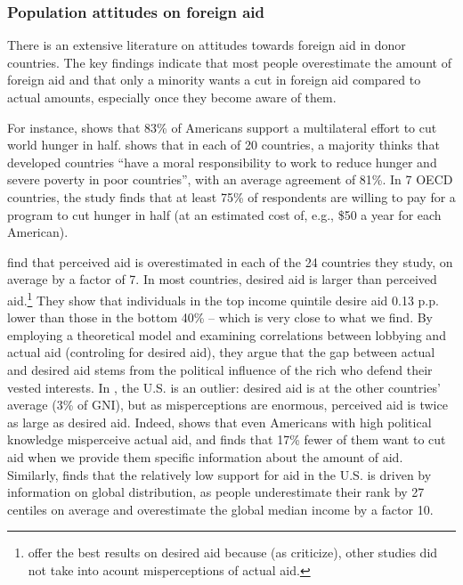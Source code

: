 \subsubsection{Population attitudes on foreign aid}\label{subsubsec:literature_foreign_aid}

There is an extensive literature on attitudes towards foreign aid in donor countries. The key findings indicate that most people overestimate the amount of foreign aid and that only a minority wants a cut in foreign aid compared to actual amounts, especially once they become aware of them. 

For instance,  shows that 83\% of Americans support a multilateral effort to cut world hunger in half. 
 shows that in each of 20 countries, a majority thinks that developed countries ``have a moral responsibility to work to reduce hunger and severe poverty in poor countries'', with an average agreement of 81\%. In 7 OECD countries, the study finds that at least 75\% of respondents are willing to pay for a program to cut hunger in half (at an estimated cost of, e.g., \$50 a year for each American). 

 find that perceived aid is overestimated in each of the 24 countries they study, on average by a factor of 7. In most countries, desired aid is larger than perceived aid.\footnote{ offer the best results on desired aid because (as  criticize), other studies did not take into acount misperceptions of actual aid.} They show that individuals in the top income quintile desire aid 0.13 p.p. lower than those in the bottom 40\% -- which is very close to what we find. %
By employing a theoretical model and examining correlations between lobbying and actual aid (controling for desired aid), they argue that the gap between actual and desired aid stems from the political influence of the rich who defend their vested interests. 
In , the U.S. is an outlier: desired aid is at the other countries' average (3\% of GNI), but as misperceptions are enormous, perceived aid is twice as large as desired aid. Indeed,  shows that even Americans with high political knowledge misperceive actual aid, and finds that 17\% fewer of them want to cut aid when we provide them specific information about the amount of aid. %
Similarly,  finds that the relatively low support for aid in the U.S. is driven by information on global distribution, as people underestimate their rank by 27 centiles on average and overestimate the global median income by a factor 10. 

